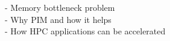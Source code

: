 -	Memory bottleneck problem \\
-	Why PIM and how it helps \\
-	How HPC applications can be accelerated \\
